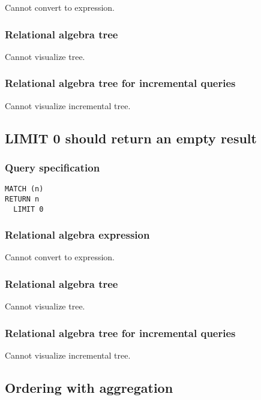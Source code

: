 Cannot convert to expression.

\subsubsection*{Relational algebra tree}

Cannot visualize tree.

\subsubsection*{Relational algebra tree for incremental queries}

Cannot visualize incremental tree.

\subsection{LIMIT 0 should return an empty result}

\subsubsection*{Query specification}

\begin{lstlisting}
MATCH (n)
RETURN n
  LIMIT 0
\end{lstlisting}

\subsubsection*{Relational algebra expression}

Cannot convert to expression.

\subsubsection*{Relational algebra tree}

Cannot visualize tree.

\subsubsection*{Relational algebra tree for incremental queries}

Cannot visualize incremental tree.

\subsection{Ordering with aggregation}

